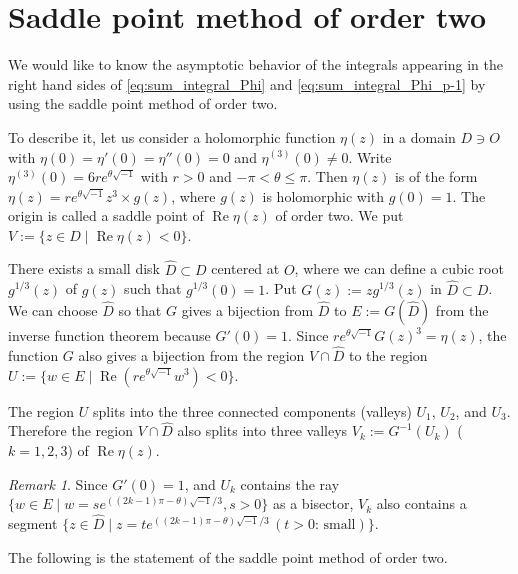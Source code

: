 \documentclass[a4paper,dvipdfmx]{amsart}
\theoremstyle{plain}
\theoremstyle{definition}
\theoremstyle{remark}
\newtheorem{rem}[thm]{Remark}
\renewcommand{\Re}{\operatorname{Re}}
\renewcommand{\i}{\sqrt{-1}}
\numberwithin{equation}{section}
\begin{document}
\section{Saddle point method of order two}\label{sec:saddle}
We would like to know the asymptotic behavior of the integrals appearing in the right hand sides of \eqref{eq:sum_integral_Phi} and \eqref{eq:sum_integral_Phi_p-1} by using the saddle point method of order two.
\par
To describe it, let us consider a holomorphic function $\eta(z)$ in a domain $D\ni O$ with $\eta(0)=\eta'(0)=\eta''(0)=0$ and $\eta^{(3)}(0)\ne0$.
Write $\eta^{(3)}(0)=6re^{\theta\i}$ with $r>0$ and $-\pi<\theta\le\pi$.
Then $\eta(z)$ is of the form $\eta(z)=re^{\theta\i}z^3\times g(z)$, where $g(z)$ is holomorphic with $g(0)=1$.
The origin is called a saddle point of $\Re{\eta(z)}$ of order two.
We put $V:=\{z\in D\mid\Re{\eta(z)}<0\}$.
\par
\label{page:E_G}
There exists a small disk $\hat{D}\subset D$ centered at $O$, where we can define a cubic root $g^{1/3}(z)$ of $g(z)$ such that $g^{1/3}(0)=1$.
Put $G(z):=zg^{1/3}(z)$ in $\hat{D}\subset D$.
We can choose $\hat{D}$ so that $G$ gives a bijection from $\hat{D}$ to $E:=G(\hat{D})$ from the inverse function theorem because $G'(0)=1$.
Since $re^{\theta\i}G(z)^3=\eta(z)$, the function $G$ also gives a bijection from the region $V\cap\hat{D}$ to the region $U:=\{w\in E\mid\Re(re^{\theta\i}w^3)<0\}$.
\par
The region $U$ splits into the three connected components (valleys) $U_1$, $U_2$, and $U_3$.
Therefore the region $V\cap\hat{D}$ also splits into three valleys $V_k:=G^{-1}(U_k)$ ($k=1,2,3$) of $\Re{\eta(z)}$.
\begin{rem}\label{rem:ray}
Since $G'(0)=1$, and $U_{k}$ contains the ray $\{w\in E\mid w=se^{((2k-1)\pi-\theta)\i/3},s>0\}$ as a bisector, $V_{k}$ also contains a segment $\{z\in\hat{D}\mid z=te^{((2k-1)\pi-\theta)\i/3}\,(\text{$t>0$: small})\}$.
\end{rem}
The following is the statement of the saddle point method of order two.
\end{document}
